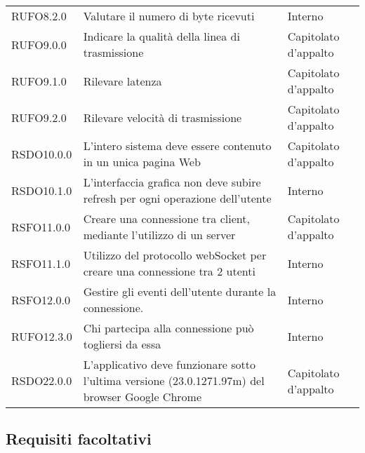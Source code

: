 \begin{longtable}{lp{}l}
RUFO8.2.0 & Valutare il numero di byte ricevuti & Interno \\
RUFO9.0.0 & Indicare la qualità della linea di trasmissione & Capitolato d'appalto \\
RUFO9.1.0 & Rilevare latenza & Capitolato d'appalto \\
RUFO9.2.0 & Rilevare velocità di trasmissione & Capitolato d'appalto \\
RSDO10.0.0 & L'intero sistema deve essere contenuto in un unica pagina Web & Capitolato d'appalto \\
RSDO10.1.0 & L'interfaccia grafica non deve subire refresh per ogni operazione dell'utente & Interno \\
RSFO11.0.0 & Creare una connessione tra client, mediante l'utilizzo di un server & Capitolato d'appalto \\
RSFO11.1.0 & Utilizzo del protocollo webSocket per creare una connessione tra 2 utenti & Interno \\
RSFO12.0.0 & Gestire gli eventi dell'utente durante la connessione. & Interno \\
RUFO12.3.0 & Chi partecipa alla connessione può togliersi da essa & Interno \\
RSDO22.0.0 & L'applicativo deve funzionare sotto l'ultima versione (23.0.1271.97m) del browser Google Chrome & Capitolato d'appalto \\
\bottomrule
\end{longtable}
\subsection{Requisiti facoltativi}

